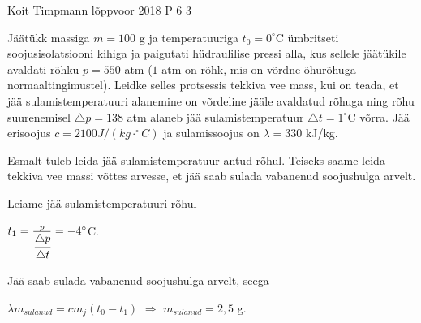 {Koit Timpmann} %
{lõppvoor} %
{2018} %
{P 6} %
{3} %
{

\ifStatement
Jäätükk massiga $m = 100$ g ja temperatuuriga $t_0 = 0^{\circ}$C ümbritseti soojusisolatsiooni kihiga ja paigutati hüdraulilise pressi alla, kus sellele jäätükile avaldati rõhku $p = 550$ atm ($1$ atm on rõhk, mis on võrdne õhurõhuga normaaltingimustel). Leidke selles protsessis tekkiva vee mass, kui on teada, et jää sulamistemperatuuri alanemine on võrdeline jääle avaldatud rõhuga ning rõhu suurenemisel $\triangle p = 138$ atm alaneb jää sulamistemperatuur $\triangle t = 1^{\circ}$C võrra. Jää erisoojus $c = 2100 J/(kg \cdot ^{\circ}C)$ ja sulamissoojus on $\lambda = 330$ kJ/kg.
\fi

\ifHint
Esmalt tuleb leida jää sulamistemperatuur antud rõhul. Teiseks saame leida tekkiva vee massi võttes arvesse, et jää saab sulada vabanenud soojushulga arvelt.
\fi

\ifSolution
Leiame jää sulamistemperatuuri rõhul
\begin{center}
$t_1 = \frac{p}{\cfrac{\triangle p}{\triangle t}} = -4 ^{\circ}$C.
\end{center}
Jää saab sulada vabanenud soojushulga arvelt, seega
\begin{center}
$\lambda m_{sulanud} = cm_j (t_0 - t_1)$ $\Rightarrow$ $m_{sulanud} = 2,5$ g.
\end{center}
\fi
}